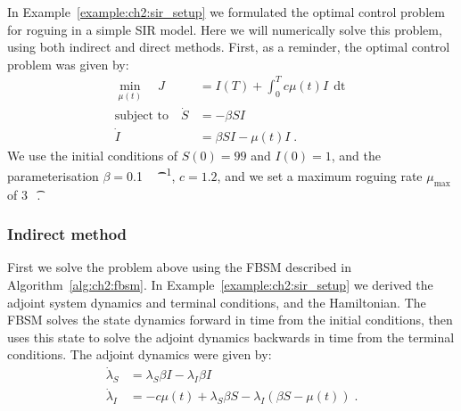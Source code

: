 \begin{example}
    In Example~\ref{example:ch2:sir_setup} we formulated the optimal control problem for roguing in a simple SIR model. Here we will numerically solve this problem, using both indirect and direct methods. First, as a reminder, the optimal control problem was given by:
    \begin{subequations}
        \begin{align}
            \min_{\mu(t)} \quad{} J &= I(T) + \int_0^Tc\mu(t)I\,\mathop{dt}\\
            \text{subject to} \quad{} \dot{S} &= -\beta{}SI\\
            \dot{I} &= \beta{}SI - \mu(t)I\;.
        \end{align}
    \end{subequations}
    We use the initial conditions of $S(0)=99$ and $I(0)=1$, and the parameterisation $\beta{}=$\SI{0.1}{\per\host\per\t}, $c=1.2$, and we set a maximum roguing rate $\mu_\text{max}$ of \SI{3}{\per\t}.

    \subsubsection{Indirect method}
    First we solve the problem above using the FBSM described in Algorithm~\ref{alg:ch2:fbsm}. In Example~\ref{example:ch2:sir_setup} we derived the adjoint system dynamics and terminal conditions, and the Hamiltonian. The FBSM solves the state dynamics forward in time from the initial conditions, then uses this state to solve the adjoint dynamics backwards in time from the terminal conditions. The adjoint dynamics were given by:
    \begin{subequations}
        \begin{align}
            \dot{\lambda}_S &= \lambda_S\beta{}I - \lambda_I\beta{}I\\
            \dot{\lambda}_I &= -c\mu(t) + \lambda_S\beta{}S - \lambda_I\left(\beta{}S - \mu(t)\right)\;.
        \end{align}
    \end{subequations}


\end{example}
